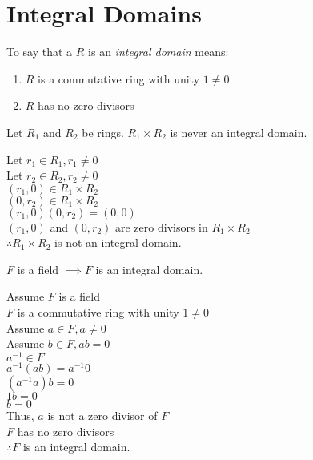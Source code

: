 \documentclass[letterpaper,12pt,fleqn]{article}
\begin{document}
\section*{Integral Domains}

\begin{definition}
  To say that a $R$ is an \emph{integral domain} means:
  \begin{enumerate}
  \item $R$ is a commutative ring with unity $1\ne0$
  \item $R$ has no zero divisors
  \end{enumerate}
\end{definition}

\begin{theorem}
  Let $R_1$ and $R_2$ be rings. $R_1\times R_2$ is never an integral domain.
\end{theorem}

\begin{theproof}
  Let $r_1\in R_1,r_1\ne0$ \\
  Let $r_2\in R_2,r_2\ne0$ \\
  $(r_1,0)\in R_1\times R_2$ \\
  $(0,r_2)\in R_1\times R_2$ \\
  $(r_1,0)(0,r_2)=(0,0)$ \\
  $(r_1,0)$ and $(0,r_2)$ are zero divisors in $R_1\times R_2$ \\
  $\therefore R_1\times R_2$ is not an integral domain.
\end{theproof}

\begin{theorem}
  $F$ is a field $\implies F$ is an integral domain.
\end{theorem}

\begin{theproof}
  Assume $F$ is a field \\
  $F$ is a commutative ring with unity $1\ne0$ \\
  Assume $a\in F,a\ne0$ \\
  Assume $b\in F,ab=0$ \\
  $a^{-1}\in F$ \\
  $a^{-1}(ab)=a^{-1}0$ \\
  $(a^{-1}a)b=0$ \\
  $1b=0$ \\
  $b=0$ \\
  Thus, $a$ is not a zero divisor of $F$ \\
  $F$ has no zero divisors \\
  $\therefore F$ is an integral domain.
\end{theproof}
\end{document}

